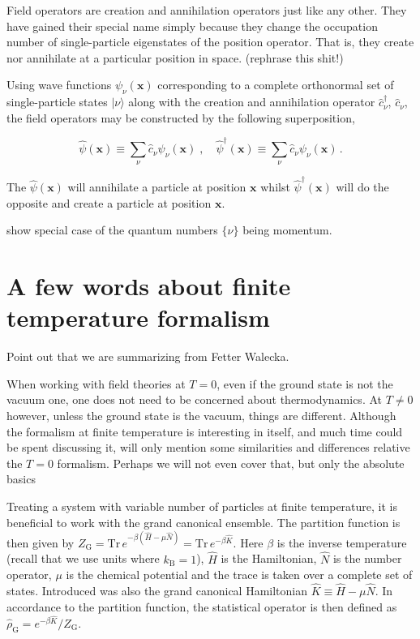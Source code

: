 \documentclass[12pt]{report}
\renewcommand{\vec}[1]{\boldsymbol{\mathbf{#1}}}                        %
\newcommand{\todo}[1]{{\leavevmode\color{todo}#1}}
\begin{document}
Field operators are creation and annihilation operators just like any other. They have gained their special name simply because they change the occupation number of single-particle eigenstates of the position operator. That is, they create nor annihilate at a particular position in space. \todo{(rephrase this shit!)}

Using wave functions $ \psi_{\nu}(\vec x) $ corresponding to a complete orthonormal set of single-particle states $ | \nu \rangle $ along with the creation and annihilation operator $ \hat c^\dagger_\nu $, $ \hat c_\nu $, the field operators may be constructed by the following superposition\cite{quantumTheoryOfManyParticleSystems},

\begin{equation}
	\label{eq:fieldOperator}
	\hat \psi (\vec x) \equiv \sum_{\nu} \hat c_{\nu} \psi_{\nu}(\vec x)
	\; , \quad
	\hat \psi^\dagger (\vec x) \equiv \sum_{\nu} \hat c_{\nu} \psi_{\nu}(\vec x) \,.
\end{equation}

The $ \hat \psi (\vec x) $ will annihilate a particle at position $ \vec x $ whilst $ \hat \psi^\dagger (\vec x) $ will do the opposite and create a particle at position $ \vec x $.

\todo{show special case of the quantum numbers $ \{ \nu \} $ being momentum.}

\section{A few words about finite temperature formalism}

\todo{Point out that we are summarizing from Fetter Walecka.}

When working with field theories at $ T = 0 $, even if the ground state is not the vacuum one, one does not need to be concerned about thermodynamics. At $ T \neq 0 $ however, unless the ground state is the vacuum, things are different. Although the formalism at finite temperature is interesting in itself, and much time could be spent discussing it, will only mention some similarities and differences relative the $ T = 0 $ formalism. \todo{Perhaps we will not even cover that, but only the absolute basics}

Treating a system with variable number of particles at finite temperature, it is beneficial to work with the grand canonical ensemble. The partition function is then given by $ Z_\text{G} = \text{Tr} \, e^{-\beta (\hat H - \mu \hat N)} = \text{Tr} \, e^{-\beta \hat K} $. Here $ \beta $ is the inverse temperature (recall that we use units where $ k_\text{B} = 1 $), $ \hat H $ is the Hamiltonian, $ \hat N $ is the number operator, $ \mu $ is the chemical potential and the trace is taken over a complete set of states. Introduced was also the grand canonical Hamiltonian $ \hat K \equiv \hat H - \mu \hat N $. In accordance to the partition function, the statistical operator is then defined as $ \hat \rho_\text{G} = e^{-\beta \hat K} / Z_\text{G} $.
\end{document}
